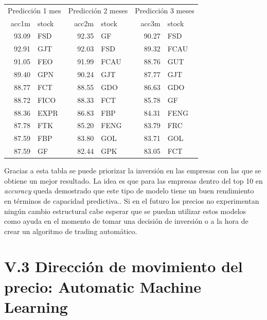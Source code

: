 \documentclass[]{DissertateUSU}
\begin{document}
\begin{table}[H]
\centering\begingroup\fontsize{10}{12}\selectfont

\begin{tabular}{r|l|r|l|r|l}
\hline
\multicolumn{2}{c|}{Predicción 1 mes} & \multicolumn{2}{c|}{Predicción 2 meses} & \multicolumn{2}{c}{Predicción 3 meses} \\
\cline{1-2} \cline{3-4} \cline{5-6}
acc1m & stock & acc2m & stock & acc3m & stock\\
\hline
93.09 & FSD & 92.35 & GF & 90.27 & FSD\\
\hline
92.91 & GJT & 92.03 & FSD & 89.32 & FCAU\\
\hline
91.05 & FEO & 91.99 & FCAU & 88.76 & GUT\\
\hline
89.40 & GPN & 90.24 & GJT & 87.77 & GJT\\
\hline
88.77 & FCT & 88.55 & GDO & 86.63 & GDO\\
\hline
88.72 & FICO & 88.33 & FCT & 85.78 & GF\\
\hline
88.36 & EXPR & 86.83 & FBP & 84.31 & FENG\\
\hline
87.78 & FTK & 85.20 & FENG & 83.79 & FRC\\
\hline
87.59 & FBP & 83.80 & GOL & 83.71 & GOL\\
\hline
87.59 & GF & 82.44 & GPK & 83.05 & FCT\\
\hline
\end{tabular}
\endgroup{}
\end{table}
\centering

\setlength\parskip{5ex}
\justifying

\noindent Gracias a esta tabla se puede priorizar la inversión en las
empresas con las que se obtiene un mejor resultado. La idea es que para
las empresas dentro del top 10 en \emph{accuracy} queda demostrado que
este tipo de modelo tiene un buen rendimiento en términos de capacidad
predictiva.. Si en el futuro los precios no experimentan ningún cambio
estructural cabe esperar que se puedan utilizar estos modelos como ayuda
en el momento de tomar una decisión de inversión o a la hora de crear un
algoritmo de trading automático.

\FloatBarrier
{}
\fancyfoot[C]{\thepage}

\section{V.3 \textbf{Dirección de movimiento del precio: Automatic Machine Learning}}
\end{document}
